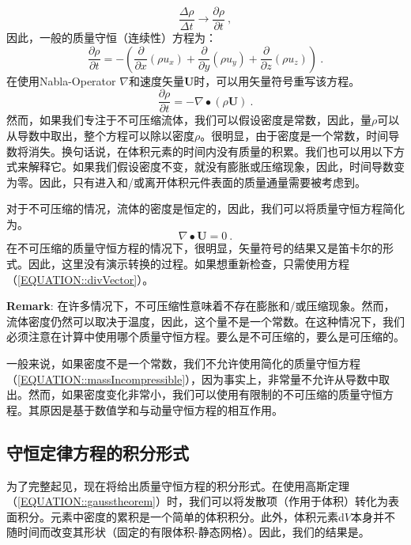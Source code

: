 \documentclass[MathematicsNumericsDerivationsAndOpenFOAM.tex]{subfiles}
\begin{document}
\begin{equation}
  \frac{\Delta \rho}{\Delta t} \to \frac{\partial \rho}{\partial t} ~,
\end{equation}
%
%
%
%
	因此，一般的质量守恒（连续性）方程为：
%
%
\begin{equation}
\boxed{
 \frac{\partial \rho}{\partial t} =
 - \left(
      \frac{\partial}{\partial x} (\rho u_x)
    + \frac{\partial}{\partial y} (\rho u_y)
    + \frac{\partial}{\partial z} (\rho u_z)
   \right)
   } ~.
\end{equation}
%
%
	在使用Nabla-Operator $\nabla$和速度矢量\textbf{U}时，可以用矢量符号重写该方程。
%
%
\begin{equation}
\boxed{
 \frac{\partial \rho}{\partial t} =
 -   \nabla \bullet \left(\rho \textbf{U}\right)
   } ~.
   \label{EQUATION::massCompressible}
\end{equation}
%
%
	然而，如果我们专注于不可压缩流体，我们可以假设密度是常数，因此，量$\rho$可以从导数中取出，整个方程可以除以密度$\rho$。很明显，由于密度是一个常数，时间导数将消失。换句话说，在体积元素的时间内没有质量的积累。我们也可以用以下方式来解释它。如果我们假设密度不变，就没有膨胀或压缩现象，因此，时间导数变为零。因此，只有进入和/或离开体积元件表面的质量通量需要被考虑到。
	
  对于不可压缩的情况，流体的密度是恒定的，因此，我们可以将质量守恒方程简化为。
%
%
\begin{equation}
 \boxed{  \nabla \bullet \textbf{U} = 0} ~.
 \label{EQUATION::massIncompressible}
\end{equation}
%
%
在不可压缩的质量守恒方程的情况下，很明显，矢量符号的结果又是笛卡尔的形式。因此，这里没有演示转换的过程。如果想重新检查，只需使用方程（\ref{EQUATION::divVector}）。

	\textbf{Remark}: 在许多情况下，不可压缩性意味着不存在膨胀和/或压缩现象。然而，流体密度仍然可以取决于温度，因此，这个量不是一个常数。在这种情况下，我们必须注意在计算中使用哪个质量守恒方程。要么是不可压缩的，要么是可压缩的。
	
  一般来说，如果密度不是一个常数，我们不允许使用简化的质量守恒方程（\ref{EQUATION::massIncompressible}），因为事实上，非常量不允许从导数中取出。然而，如果密度变化非常小，我们可以使用有限制的不可压缩的质量守恒方程。其原因是基于数值学和与动量守恒方程的相互作用。



%
%
\subsection{守恒定律方程的积分形式}
%
%
	为了完整起见，现在将给出质量守恒方程的积分形式。在使用高斯定理（\ref{EQUATION::gausstheorem}）时，我们可以将发散项（作用于体积）转化为表面积分。元素中密度的累积是一个简单的体积积分。此外，体积元素d$V$本身并不随时间而改变其形状（固定的有限体积-静态网格）。因此，我们的结果是。
%
%
\end{document}
